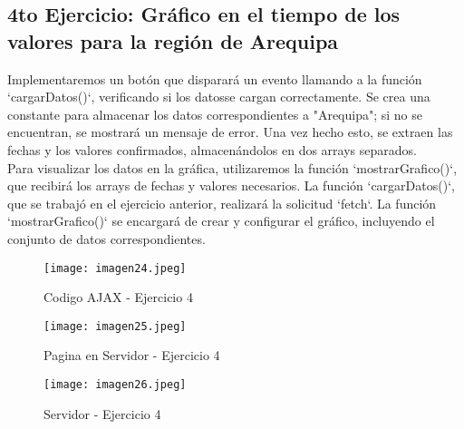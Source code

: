 \documentclass[10pt, a4paper]{article}
\begin{document}
	\subsection*{4to Ejercicio: Gráfico en el tiempo de los valores para la región de Arequipa} 
	\begin{flushleft}
	Implementaremos un botón que disparará un evento llamando a la función `cargarDatos()`, verificando si los datosse cargan correctamente. Se crea una constante para almacenar los datos correspondientes a "Arequipa"; si no se encuentran, se mostrará un mensaje de error. Una vez hecho esto, se extraen las fechas y los valores confirmados, almacenándolos en dos arrays separados. \\
	Para visualizar los datos en la gráfica, utilizaremos la función `mostrarGrafico()`, que recibirá los arrays de fechas y valores necesarios. La función `cargarDatos()`, que se trabajó en el ejercicio anterior, realizará la solicitud `fetch`. La función `mostrarGrafico()` se encargará de crear y configurar el gráfico, incluyendo el conjunto de datos correspondientes.
	\end{flushleft}
	\begin{figure}[h]
		\centering
		\texttt{[image: imagen24.jpeg]}
		\caption{Codigo AJAX - Ejercicio 4}
	\end{figure}
	\begin{figure}[h]
		\centering
		\texttt{[image: imagen25.jpeg]}
		\caption{Pagina en Servidor - Ejercicio 4}
	\end{figure}
	\begin{figure}[h]
		\centering
		\texttt{[image: imagen26.jpeg]}
		\caption{Servidor - Ejercicio 4}
	\end{figure}
	\vspace*{8cm}
\end{document}
